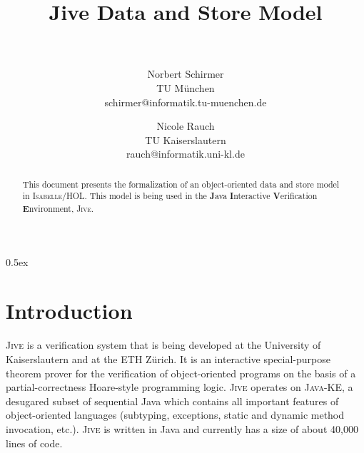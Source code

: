 \documentclass[11pt,a4paper,twoside]{article}
\renewcommand{\jive}{\textsc{Jive}\xspace}
\newcommand{\isabelleH}{\textsc{Isabelle/HOL}\xspace}
\newcommand{\javake}{\textsc{Java-KE}\xspace}
\begin{document}
\title{%
Jive Data and Store Model\\[1cm]
~}
\author{
Norbert Schirmer\\TU M\"unchen\\schirmer@informatik.tu-muenchen.de
\and
Nicole Rauch\\TU Kaiserslautern\\rauch@informatik.uni-kl.de}

\date{}

\maketitle

\begin{abstract}
This document presents  the formalization of an object-oriented data and store model in \isabelleH.
This model is being used in the \textbf{J}ava \textbf{I}nteractive \textbf{V}erification \textbf{E}nvironment, \jive.
\end{abstract}

\thispagestyle{empty}


\cleardoublepage

\tableofcontents
{}

\parindent 0pt\parskip 0.5ex

\cleardoublepage

\section{Introduction}

\jive \cite{Meyer.Poetzsch-Heffter00architecture,Jive} is a verification system that is being developed at the 
University of Kai\-sers\-lautern and at the ETH 
Z\"urich. It is an interactive special-purpose theorem 
prover for the verification of object-oriented programs on the basis of a partial-correctness Hoare-style programming logic.
\jive operates on \javake \cite{Poetzsch-Heffter.Gaillourdet.EA05hoare},
a desugared subset of sequential Java which contains all important features of object-oriented languages
(subtyping, exceptions, static and dynamic method invocation, etc.). \jive is written in Java and currently has a size of about 40,000 lines of code.
\end{document}
